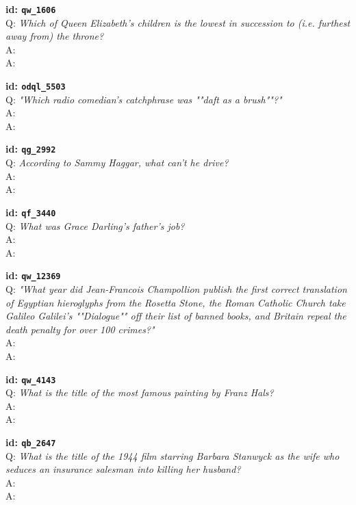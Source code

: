 \tiny{\setlength{\parindent}{0cm}
\textbf{id: \texttt{qw\_1606}} \\
Q: \textit{Which of Queen Elizabeth's children is the lowest in succession to (i.e. furthest away from) the throne?} \\
A:  \\
A: }

\tiny{\setlength{\parindent}{0cm}
\textbf{id: \texttt{odql\_5503}} \\
Q: \textit{"Which radio comedian's catchphrase was ""daft as a brush""?"} \\
A:  \\
A: }

\tiny{\setlength{\parindent}{0cm}
\textbf{id: \texttt{qg\_2992}} \\
Q: \textit{According to Sammy Haggar, what can't he drive?} \\
A:  \\
A: }

\tiny{\setlength{\parindent}{0cm}
\textbf{id: \texttt{qf\_3440}} \\
Q: \textit{What was Grace Darling's father's job?} \\
A:  \\
A: }

\tiny{\setlength{\parindent}{0cm}
\textbf{id: \texttt{qw\_12369}} \\
Q: \textit{"What year did Jean-Francois Champollion publish the first correct translation of Egyptian hieroglyphs from the Rosetta Stone, the Roman Catholic Church take Galileo Galilei's ""Dialogue"" off their list of banned books, and Britain repeal the death penalty for over 100 crimes?"} \\
A:  \\
A: }

\tiny{\setlength{\parindent}{0cm}
\textbf{id: \texttt{qw\_4143}} \\
Q: \textit{What is the title of the most famous painting by Franz Hals?} \\
A:  \\
A: }

\tiny{\setlength{\parindent}{0cm}
\textbf{id: \texttt{qb\_2647}} \\
Q: \textit{What is the title of the 1944 film starring Barbara Stanwyck as the wife who seduces an insurance salesman into killing her husband?} \\
A:  \\
A: }

